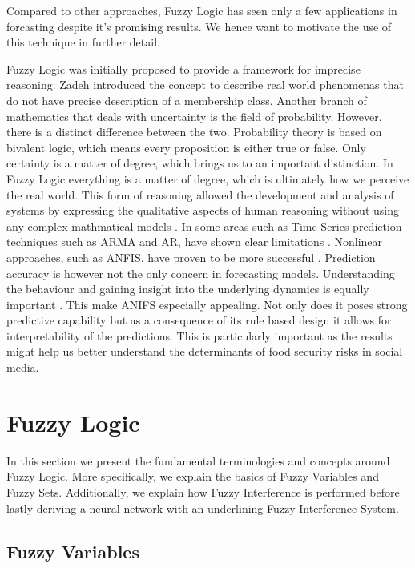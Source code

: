 Compared to other approaches, Fuzzy Logic has seen only a few applications in forcasting despite it's promising results. We hence want to motivate the use of this technique in further detail. 

Fuzzy Logic was initially proposed to provide a framework for imprecise reasoning. Zadeh \cite{Zadeh65} introduced the concept to describe real world phenomenas that do not have precise description of a membership class. Another branch of mathematics that deals with uncertainty is the field of probability. However, there is a distinct difference between the two. Probability theory is based on bivalent logic, which means every proposition is either true or false. Only certainty is a matter of degree, which brings us to an important distinction. In Fuzzy Logic everything is a matter of degree, which is ultimately how we perceive the real world. This form of reasoning allowed the development and analysis of  systems by expressing the qualitative aspects of human reasoning without using any complex mathmatical models \cite{Jang91}.  
In some areas such as Time Series prediction techniques such as ARMA and AR, have shown clear limitations \cite{box90}. Nonlinear approaches, such as ANFIS, have proven to be more successful \cite{chap04}. Prediction accuracy is however not the only concern in forecasting models. Understanding the behaviour and gaining insight into the underlying dynamics is equally important \cite{neil93}. This make ANIFS especially appealing. Not only does it poses strong predictive capability but as a consequence of its rule based design it allows for interpretability of the predictions. This is particularly important as the results might help us better understand the determinants of food security risks in social media. 

\section{Fuzzy Logic}

In this section we present the fundamental terminologies and concepts around Fuzzy Logic. More specifically, we explain the basics of Fuzzy Variables and Fuzzy Sets.  Additionally, we explain how Fuzzy Interference is performed before lastly deriving a neural network with an underlining Fuzzy Interference System. 

\subsection {Fuzzy Variables }

